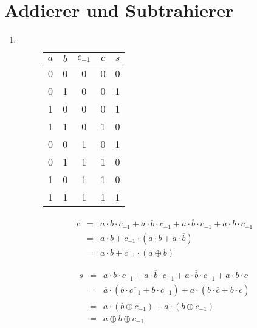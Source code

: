 \documentclass[DIN, pagenumber=false, fontsize=11pt, parskip=half]{scrartcl}
\begin{document}
    \section{Addierer und Subtrahierer}
    \begin{enumerate}[label=(\alph*)]
        \item $ $
            \begin{figure}[H]
                \centering
                \begin{tabular}{ccc|cc}
                    \toprule
                    $a$ & $b$ & $c_{-1}$ & $c$ & $s$\\
                    \midrule
                    0 & 0 & 0 & 0 & 0 \\ 
                    0 & 1 & 0 & 0 & 1 \\ 
                    1 & 0 & 0 & 0 & 1 \\ 
                    1 & 1 & 0 & 1 & 0 \\ 
                    0 & 0 & 1 & 0 & 1 \\ 
                    0 & 1 & 1 & 1 & 0 \\ 
                    1 & 0 & 1 & 1 & 0 \\ 
                    1 & 1 & 1 & 1 & 1 \\ 
                    \bottomrule
                \end{tabular}
            \end{figure}
            \begin{eqnarray*}
                c &=& a \cdot b \cdot \overline{c_{-1}} + \overline{a} \cdot b \cdot c_{-1} + a \cdot \overline{b} \cdot c_{-1} + a \cdot b \cdot c_{-1} \\
                &=& a \cdot b + c_{-1} \cdot (\overline{a} \cdot b + a \cdot \overline{b}) \\
                &=& a \cdot b + c_{-1} \cdot (a \oplus b) 
            \end{eqnarray*}

            \begin{eqnarray*}
                s &=& \overline{a} \cdot b \cdot \overline{c_{-1}} + a \cdot \overline{b} \cdot \overline{c_{-1}} + \overline{a} \cdot \overline{b} \cdot c_{-1} + a \cdot b \cdot c \\
                &=& \overline{a} \cdot (b \cdot \overline{c_{-1}} + \overline{b} \cdot c_{-1}) + a \cdot (\overline{b} \cdot \overline{c} + b \cdot c) \\
                &=& \overline{a} \cdot (b \oplus c_{-1}) + a \cdot \overline{(b \oplus c_{-1})} \\
                &=& a \oplus b \oplus c_{-1}
            \end{eqnarray*}


\end{enumerate}
\end{document}
